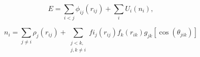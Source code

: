 \documentclass[12pt]{article}
\begin{document}
$$
   E=\sum_{i<j}\phi_{ij}(r_{ij})+\sum_{i}U_i(n_{i}),
$$

$$
   n_{i}=\sum_{j\ne i}\rho_j(r_{ij})+\sum_{\substack{j<k,\\j,k\neq i}}fi_{j}(r_{ij})f_{k}(r_{ik})g_{jk}[\cos(\theta_{jik})]
$$
\end{document}
